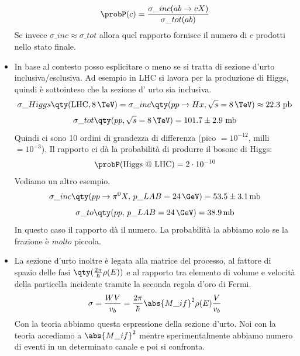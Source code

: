 \begin{itemize}
        \begin{equation*}
        \probP(c)=\frac{\sigma\_{inc}(ab\to cX)}{\sigma\_{tot}(ab)}
        \end{equation*} 
        Se invece $\sigma\_{inc}\approx\sigma\_{tot}$ allora quel rapporto fornisce il numero di $c$ prodotti nello stato finale. 
        \item In base al contesto posso esplicitare o meno se si tratta di sezione d'urto inclusiva/esclusiva. Ad esempio in LHC si lavora per la produzione di Higgs, quindi è sottointeso che la sezione d' urto sia inclusiva.
        \begin{equation*}
        \sigma\_{Higgs}\qty(\text{LHC},8\,\TeV)=\sigma\_{inc}\qty(pp\to Hx,\sqrt s =8\,\TeV)\approx22.3 \text{ pb}
        \end{equation*}
        \begin{equation*}
        \sigma\_{tot}\qty(pp,\sqrt s=8\,\TeV)=101.7\pm2.9\text{ mb}
        \end{equation*}
        Quindi ci sono 10 ordini di grandezza di differenza (pico $=10^{-12}$, milli $=10^{-3}$). Il rapporto ci dà la probabilità di produrre il bosone di Higgs:
        \begin{equation*}
            \probP(\text{Higgs @ LHC})=2\cdot 10^{-10}
        \end{equation*}
        Vediamo un altro esempio.
        \begin{equation*}
            \sigma\_{inc}\qty(pp\to\pi^0X,\,p\_{LAB}=24\,\GeV)=53.5\pm3.1\,\text{mb}
        \end{equation*}
        \begin{equation*}
            \sigma\_{to}\qty(pp,\,p\_{LAB}=24\,\GeV)=38.9\,\text{mb}
        \end{equation*}
        In questo caso il rapporto dà il numero. La probabilità la abbiamo solo se la frazione è \textit{molto} piccola.
        \item La sezione d'urto inoltre è legata alla matrice del processo, al fattore di spazio delle fasi $\qty(\frac{2\pi}\hbar\rho(E))$ e al rapporto tra elemento di volume e velocità della particella incidente tramite la seconda regola d'oro di Fermi.
        \begin{equation*}
            \sigma=\frac{WV}{v_b}=\frac{2\pi}\hbar\abs{M\_{if}}^2\rho(E)\frac V {v_b}
        \end{equation*}
        Con la teoria abbiamo questa espressione della sezione d'urto. Noi con la teoria accediamo a $\abs{M\_{if}}^2$ mentre sperimentalmente abbiamo numero di eventi in un determinato canale e poi si confronta.

\end{itemize}
